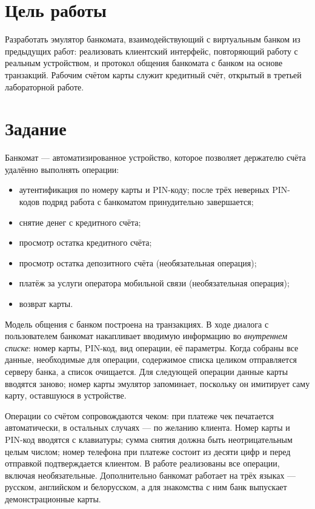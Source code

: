 \documentclass[14pt,a4paper]{extarticle}
\begin{document}

\tableofcontents

\section{Цель работы}

Разработать эмулятор банкомата, взаимодействующий с виртуальным банком из предыдущих
работ: реализовать клиентский интерфейс, повторяющий работу с реальным устройством, и
протокол общения банкомата с банком на основе транзакций. Рабочим счётом карты служит
кредитный счёт, открытый в третьей лабораторной работе.

\section{Задание}

Банкомат --- автоматизированное устройство, которое позволяет держателю счёта удалённо
выполнять операции:
\begin{itemize}
\item аутентификация по номеру карты и PIN-коду; после трёх неверных PIN-кодов подряд
работа с банкоматом принудительно завершается;
\item снятие денег с кредитного счёта;
\item просмотр остатка кредитного счёта;
\item просмотр остатка депозитного счёта (необязательная операция);
\item платёж за услуги оператора мобильной связи (необязательная операция);
\item возврат карты.
\end{itemize}

Модель общения с банком построена на транзакциях. В ходе диалога с пользователем банкомат
накапливает вводимую информацию во \textit{внутреннем списке}: номер карты, PIN-код, вид
операции, её параметры. Когда собраны все данные, необходимые для операции, содержимое
списка целиком отправляется серверу банка, а список очищается. Для следующей операции
данные карты вводятся заново; номер карты эмулятор запоминает, поскольку он имитирует саму
карту, оставшуюся в устройстве.

Операции со счётом сопровождаются чеком: при платеже чек печатается автоматически, в
остальных случаях --- по желанию клиента. Номер карты и PIN-код вводятся с клавиатуры; сумма
снятия должна быть неотрицательным целым числом; номер телефона при платеже состоит из
десяти цифр и перед отправкой подтверждается клиентом. В работе реализованы все операции,
включая необязательные. Дополнительно банкомат работает на трёх языках --- русском,
английском и белорусском, а для знакомства с ним банк выпускает демонстрационные карты.
\end{document}
